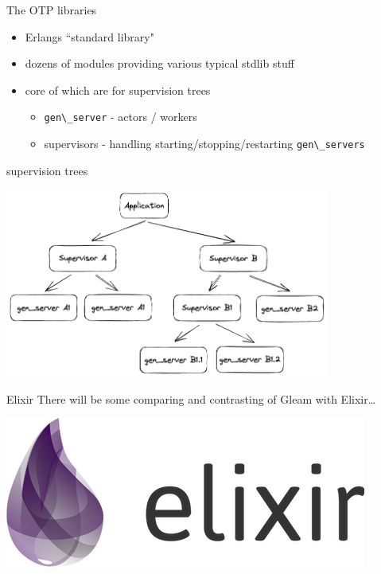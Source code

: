 \documentclass[
  ignorenonframetext,
  aspectratio=169]{beamer}
\newcommand{\passthrough}[1]{#1}
\providecommand{\tightlist}{%
  \setlength{\itemsep}{0pt}\setlength{\parskip}{0pt}}
\begin{document}
\begin{frame}[fragile]{The OTP libraries}
\label{the-otp-libraries}
\begin{itemize}
\tightlist
\item
  Erlang\textquotesingle s ``standard library"
\item
  dozens of modules providing various typical stdlib stuff
\item
  core of which are for supervision trees

  \begin{itemize}
  \tightlist
  \item
    \passthrough{\lstinline!gen\_server!} - actors / workers
  \item
    supervisors - handling starting/stopping/restarting
    \passthrough{\lstinline!gen\_servers!}
  \end{itemize}
\end{itemize}
\end{frame}

\begin{frame}{supervision trees}
\label{supervision-trees}
\begin{center}
\includegraphics[width=0.8\textwidth]{./img/tree.png}
\end{center}
\end{frame}

\begin{frame}{Elixir}
\label{elixir}
There will be some comparing and contrasting of Gleam with
Elixir\ldots{}

\begin{center}
\includegraphics[width=.5\textwidth]{./img/elixir_logo.png}
\end{center}
\end{frame}
\end{document}
